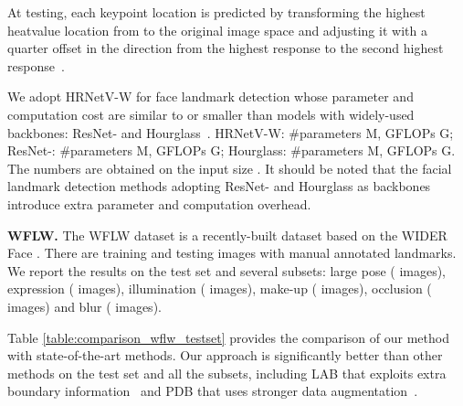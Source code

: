 \documentclass[10pt,twocolumn,letterpaper]{article}
\begin{document}
At testing,
each keypoint location is predicted
by transforming the highest heatvalue location from 
to the original image space
and adjusting it with a quarter offset
in the direction from the highest response
to the second highest response~\cite{ChenSWLY17}.

We adopt HRNetV-W for face landmark detection
whose parameter and computation cost
are similar to or smaller than
models with widely-used backbones: ResNet- and Hourglass~\cite{NewellYD16}.
HRNetV-W: \#parameters M, GFLOPs G;
ResNet-: \#parameters M, GFLOPs G;
Hourglass: \#parameters M, GFLOPs G.
The numbers are obtained on the input size .
It should be noted that
the facial landmark detection methods adopting ResNet- and Hourglass as backbones
introduce extra parameter and computation overhead.

\vspace{.1cm}
\noindent\textbf{WFLW.}
The WFLW dataset \cite{Wu0YWC018} is a recently-built
dataset based on the WIDER Face \cite{YangLLT16}.
There are  training and  testing images
with  manual annotated landmarks.
We report the results on the test set and several subsets:
large pose ( images), expression ( images),
illumination ( images), make-up ( images), occlusion ( images) and blur (
images).

Table \ref{table:comparison_wflw_testset} provides the comparison of our method with state-of-the-art methods.
Our approach is significantly better than other methods on the test set and all the subsets,
including LAB that exploits extra boundary information~\cite{Wu0YWC018} and PDB that uses stronger data augmentation~\cite{FengKA0W18}.
\end{document}
